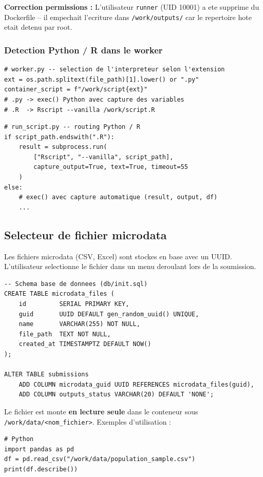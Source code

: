 \documentclass[12pt,a4paper]{article}
\begin{document}
\textbf{Correction permissions :} L'utilisateur \texttt{runner} (UID 10001) a ete supprime
du Dockerfile -- il empechait l'ecriture dans \texttt{/work/outputs/} car le repertoire
hote etait detenu par root.

\subsubsection*{Detection Python / R dans le worker}

\begin{lstlisting}
# worker.py -- selection de l'interpreteur selon l'extension
ext = os.path.splitext(file_path)[1].lower() or ".py"
container_script = f"/work/script{ext}"
# .py -> exec() Python avec capture des variables
# .R  -> Rscript --vanilla /work/script.R
\end{lstlisting}

\begin{lstlisting}
# run_script.py -- routing Python / R
if script_path.endswith(".R"):
    result = subprocess.run(
        ["Rscript", "--vanilla", script_path],
        capture_output=True, text=True, timeout=55
    )
else:
    # exec() avec capture automatique (result, output, df)
    ...
\end{lstlisting}

\subsection{Selecteur de fichier microdata}

Les fichiers microdata (CSV, Excel) sont stockes en base avec un UUID.
L'utilisateur selectionne le fichier dans un menu deroulant lors de la soumission.

\begin{lstlisting}
-- Schema base de donnees (db/init.sql)
CREATE TABLE microdata_files (
    id         SERIAL PRIMARY KEY,
    guid       UUID DEFAULT gen_random_uuid() UNIQUE,
    name       VARCHAR(255) NOT NULL,
    file_path  TEXT NOT NULL,
    created_at TIMESTAMPTZ DEFAULT NOW()
);

ALTER TABLE submissions
    ADD COLUMN microdata_guid UUID REFERENCES microdata_files(guid),
    ADD COLUMN outputs_status VARCHAR(20) DEFAULT 'NONE';
\end{lstlisting}

Le fichier est monte \textbf{en lecture seule} dans le conteneur sous
\texttt{/work/data/<nom\_fichier>}. Exemples d'utilisation :

\begin{lstlisting}
# Python
import pandas as pd
df = pd.read_csv("/work/data/population_sample.csv")
print(df.describe())
\end{lstlisting}
\end{document}
